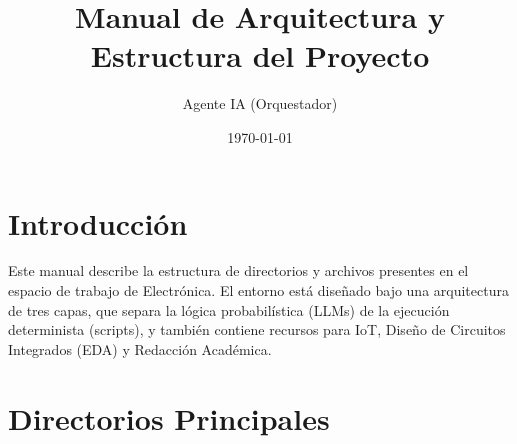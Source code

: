 \documentclass[12pt,a4paper]{article}
\title{Manual de Arquitectura y Estructura del Proyecto}
\author{Agente IA (Orquestador)}
\date{\today}
\begin{document}
\maketitle
\tableofcontents
\newpage

\section{Introducción}
Este manual describe la estructura de directorios y archivos presentes en el espacio de trabajo de Electrónica. El entorno está diseñado bajo una arquitectura de tres capas, que separa la lógica probabilística (LLMs) de la ejecución determinista (scripts), y también contiene recursos para IoT, Diseño de Circuitos Integrados (EDA) y Redacción Académica.

\section{Directorios Principales}
\end{document}
